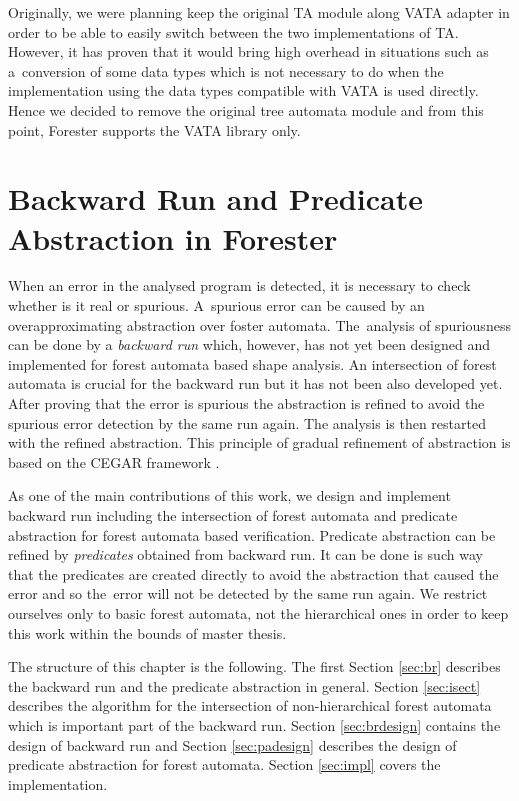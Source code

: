 Originally, we were planning keep the original TA module along VATA adapter
in order to be able to easily switch between the two implementations of TA.
However, it has proven that it would bring high overhead in situations such as
a~conversion of some data types which is not necessary to do
when the implementation using the data types compatible
with VATA is used directly.
Hence we decided to remove the original tree automata module and
from this point, Forester supports the VATA library only.

\chapter{Backward Run and Predicate Abstraction in Forester}
\label{ch:backward}

When an error in the analysed program is detected,
it is necessary to check whether is it real or spurious.
A~spurious error can be caused by an overapproximating abstraction over foster automata.
The~analysis of spuriousness can be done by a \emph{backward run} which, however, has not
yet been designed and implemented for forest automata based shape analysis.
An intersection of forest automata is crucial for the backward run but it has not
been also developed yet.
After proving that the error is spurious the abstraction is refined to avoid
the spurious error detection by the same run again.
The analysis is then restarted with the refined abstraction.
This principle of gradual refinement of abstraction is based on the CEGAR framework \cite{cegar}.

As one of the main contributions of this work,
we design and implement backward run including the intersection of forest automata
and predicate abstraction \cite{artmc} for forest automata based verification.
Predicate abstraction can be refined by \emph{predicates} obtained from backward run.
It can be done is such way that the predicates are created directly
to avoid the abstraction that caused the error
and so the~error will not be detected by the same run again.
We restrict ourselves only to basic forest automata, not the hierarchical ones
in order to keep this work within the bounds of master thesis.

The structure of this chapter is the following.
The first Section \ref{sec:br} describes the backward run and the predicate abstraction in general.
Section \ref{sec:isect} describes the algorithm for the intersection of non-hierarchical forest automata
which is important part of the backward run.
Section \ref{sec:brdesign} contains the design of backward run
and Section \ref{sec:padesign} describes the design of predicate abstraction for forest automata.
Section \ref{sec:impl} covers the implementation.

